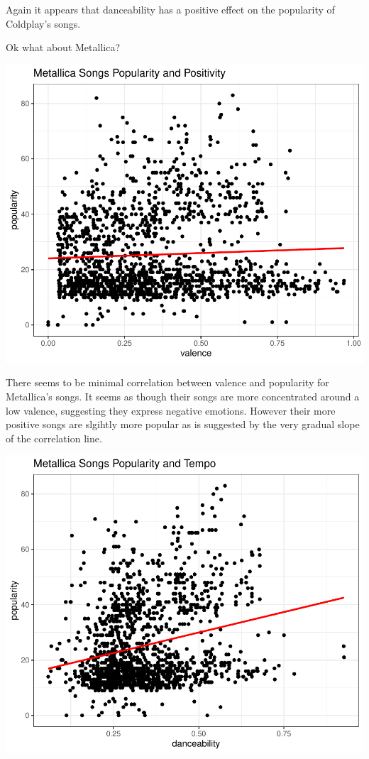 \documentclass[11pt,preprint, authoryear]{elsarticle}
\numberwithin{equation}{section}
\numberwithin{figure}{section}
\numberwithin{table}{section}
\begin{document}
Again it appears that danceability has a positive effect on the
popularity of Coldplay's songs.

Ok what about Metallica?

\includegraphics{Question_3_files/figure-latex/unnamed-chunk-4-1.pdf}

There seems to be minimal correlation between valence and popularity for
Metallica's songs. It seems as though their songs are more concentrated
around a low valence, suggesting they express negative emotions. However
their more positive songs are slgihtly more popular as is suggested by
the very gradual slope of the correlation line.

\includegraphics{Question_3_files/figure-latex/unnamed-chunk-5-1.pdf}
\end{document}
